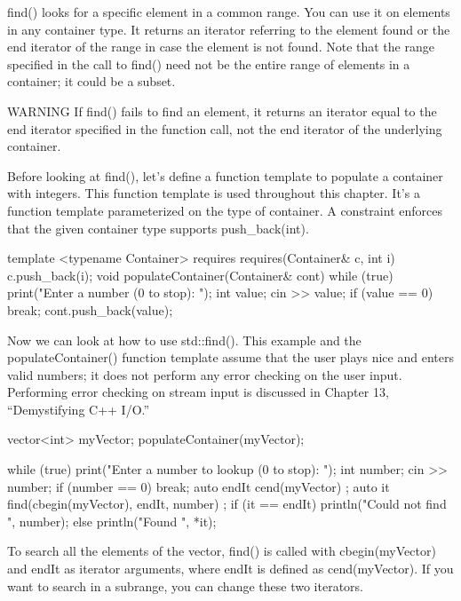 
find() looks for a specific element in a common range. You can use it on elements in any container type. It returns an iterator referring to the element found or the end iterator of the range in case the element is not found. Note that the range specified in the call to find() need not be the entire range of elements in a container; it could be a subset.

\begin{myWarning}{WARNING}
If find() fails to find an element, it returns an iterator equal to the end iterator specified in the function call, not the end iterator of the underlying container.
\end{myWarning}

Before looking at find(), let’s define a function template to populate a container with integers. This function template is used throughout this chapter. It’s a function template parameterized on the type of container. A constraint enforces that the given container type supports push\_back(int).

\begin{cpp}
template <typename Container>
    requires requires(Container& c, int i) { c.push_back(i); }
void populateContainer(Container& cont)
{
    while (true) {
        print("Enter a number (0 to stop): ");
        int value;
        cin >> value;
        if (value == 0) { break; }
        cont.push_back(value);
    }
}
\end{cpp}

Now we can look at how to use std::find(). This example and the populateContainer() function template assume that the user plays nice and enters valid numbers; it does not perform any error checking on the user input. Performing error checking on stream input is discussed in Chapter 13, “Demystifying C++ I/O.”

\begin{cpp}
vector<int> myVector;
populateContainer(myVector);

while (true) {
    print("Enter a number to lookup (0 to stop): ");
    int number;
    cin >> number;
    if (number == 0) { break; }
    auto endIt { cend(myVector) };
    auto it { find(cbegin(myVector), endIt, number) };
    if (it == endIt) {
        println("Could not find {}", number);
    } else {
        println("Found {}", *it);
    }
}
\end{cpp}

To search all the elements of the vector, find() is called with cbegin(myVector) and endIt as iterator arguments, where endIt is defined as cend(myVector). If you want to search in a subrange, you can change these two iterators.

